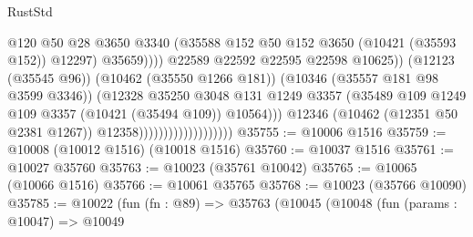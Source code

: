 \begin{lexlean}{RustStd}
\begin{coremodule}
                                                        @120
                                                        @50
                                                        @28
                                                        @3650
                                                        @3340
                                                        (@35588
                                                          @152
                                                          @50
                                                          @152
                                                          @3650
                                                          (@10421 (@35593 @152))
                                                          @12297)
                                                        @35659))))
                                                @22589
                                                @22592
                                                @22595
                                                @22598
                                                @10625))
                                            (@12123 (@35545 @96))
                                            (@10462 (@35550 @1266 @181))
                                            (@10346 (@35557 @181 @98 @3599 @3346))
                                            (@12328
                                              @35250
                                              @3048
                                              @131
                                              @1249
                                              @3357
                                              (@35489
                                                @109
                                                @1249
                                                @109
                                                @3357
                                                (@10421 (@35494 @109))
                                                @10564)))
                                          @12346
                                          (@10462 (@12351 @50 @2381 @1267))
                                          @12358)))))))))))))))))))
@35755 := @10006 @1516
@35759 := @10008 (@10012 @1516) (@10018 @1516)
@35760 := @10037 @1516
@35761 := @10027 @35760
@35763 := @10023 (@35761 @10042)
@35765 := @10065 (@10066 @1516)
@35766 := @10061 @35765
@35768 := @10023 (@35766 @10090)
@35785 := @10022
    (fun (fn : @89) =>
    @35763
      (@10045
        (@10048
          (fun (params : @10047) =>
          @10049

\end{coremodule}
\end{lexlean}
